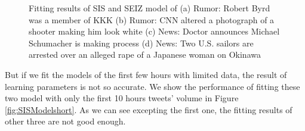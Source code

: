 \begin{figure}[!h]
{}
\caption{Fitting results of SIS and SEIZ model of (a) Rumor: Robert Byrd was a member of KKK (b) Rumor: CNN altered a photograph of a shooter making him look white (c) News: Doctor announces Michael Schumacher is making process (d) News: Two U.S. sailors are arrested over an alleged rape of a Japanese woman on Okinawa}
\label{fig:SISModel}
\end{figure}

 
But if we fit the models of the first few hours with limited data, the result of learning parameters is not so accurate.  We show the performance of fitting these two model with only the first 10 hours tweets' volume in Figure \ref{fig:SISModelshort}. As we can see excepting the first one, the fitting results of other three are not good enough.

